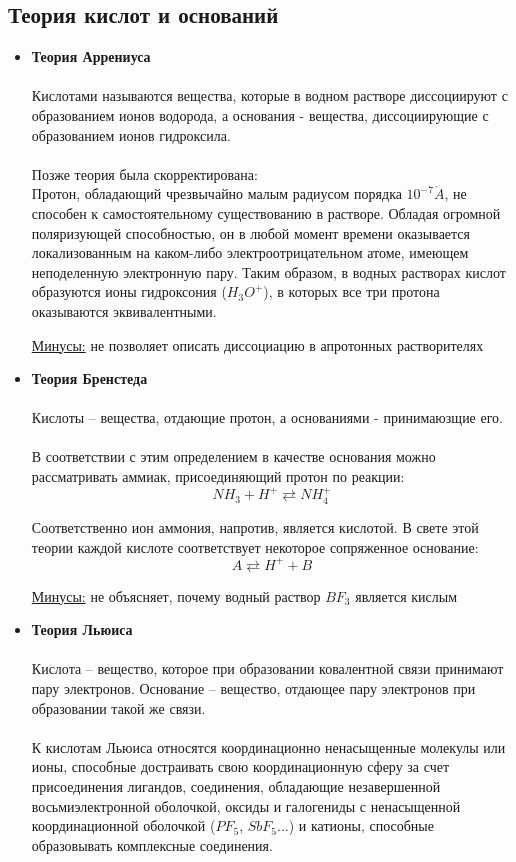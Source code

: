 \documentclass[14pt,a4paper]{scrartcl}
\renewcommand{\AA}{\ensuremath{\mathring{A}}}
\begin{document}
\subsection*{Теория кислот и оснований}
\begin{itemize}
	\item \textbf{Теория Аррениуса}\\\\
	Кислотами называются вещества, которые в водном растворе диссоциируют с образованием ионов водорода, а основания - вещества, диссоциирующие с образованием ионов гидроксила.\\\\
	Позже теория была скорректирована: \\
	Протон, обладающий чрезвычайно малым радиусом порядка  $10^{-7} \AA $, не способен к самостоятельному существованию в растворе. Обладая огромной поляризующей способностью, он в любой момент времени оказывается локализованным на каком-либо электроотрицательном атоме, имеющем неподеленную электронную пару. Таким образом, в водных растворах кислот образуются ионы гидроксония ($H_3O^+ $),  в которых все три протона оказываются эквивалентными.

	\ul{Минусы:} не позволяет описать диссоциацию в апротонных растворителях
	\item \textbf{Теория Бренстеда}\\\\
	Кислоты -- вещества, отдающие протон, а основаниями - принимаюзщие его. \\\\
	В соответствии с этим определением в качестве основания можно рассматривать аммиак, присоединяющий протон по реакции:
 	$$NH_3 + H^+ \rightleftarrows NH_4^+ $$

	Соответственно ион аммония, напротив, является кислотой. В свете этой теории каждой кислоте соответствует некоторое сопряженное основание:
 	$$ A \rightleftarrows H^+ + B$$
 
 	\ul{Минусы:} не объясняет, почему водный раствор $BF_3$ является кислым
 
	\item \textbf{Теория Льюиса}\\\\
	Кислота -- вещество, которое при образовании ковалентной связи принимают пару электронов. Основание -- вещество, отдающее пару электронов при образовании такой же связи. \\\\
 	К кислотам Льюиса относятся координационно ненасыщенные молекулы или ионы, способные достраивать свою координационную сферу за счет присоединения лигандов, соединения, обладающие незавершенной восьмиэлектронной оболочкой, оксиды и галогениды с ненасыщенной координационной оболочкой ($PF_5$, $SbF_5$...) и катионы, способные образовывать комплексные соединения.
 

\end{itemize}
\end{document}
